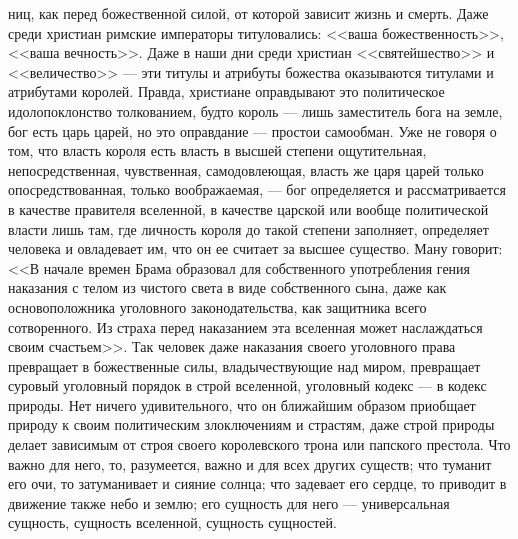 \documentclass[12pt]{article}
\begin{document}
ниц, как перед божественной силой, от которой зависит жизнь и смерть. Даже среди христиан римские императоры титуловались: <<ваша божественность>>, <<ваша вечность>>. Даже в наши дни среди христиан <<святейшество>> и <<величество>> --- эти титулы и атрибуты божества оказываются титулами и атрибутами королей. Правда, христиане оправдывают это политическое идолопоклонство толкованием, будто король --- лишь заместитель бога на земле, бог есть царь царей, но это оправдание --- простои самообман. Уже не говоря о том, что власть короля есть власть в высшей степени ощутительная, непосредственная, чувственная, самодовлеющая, власть же царя царей только опосредствованная, только воображаемая, --- бог определяется и рассматривается в качестве правителя вселенной, в качестве царской или вообще политической власти лишь там, где личность короля до такой степени заполняет, определяет человека и овладевает им, что он ее считает за высшее существо. Ману говорит: <<В начале времен Брама образовал для собственного употребления гения наказания с телом из чистого света в виде собственного сына, даже как основоположника уголовного законодательства, как защитника всего сотворенного. Из страха перед наказанием эта вселенная может наслаждаться своим счастьем>>. Так человек даже наказания своего уголовного права превращает в божественные силы, владычествующие над миром, превращает суровый уголовный порядок в строй вселенной, уголовный кодекс --- в кодекс природы. Нет ничего удивительного, что он ближайшим образом приобщает природу к своим политическим злоключениям и страстям, даже строй природы делает зависимым от строя своего королевского трона или папского престола. Что важно для него, то, разумеется, важно и для всех других существ; что туманит его очи, то затуманивает и сияние солнца; что задевает его сердце, то приводит в движение также небо и землю; его сущность для него --- универсальная сущность, сущность вселенной, сущность сущностей.


\section{}
\end{document}
